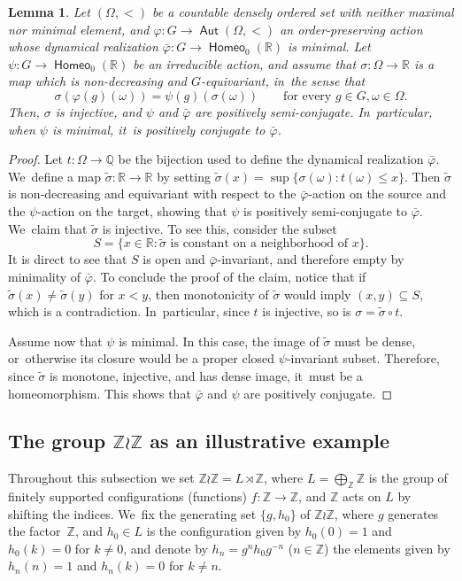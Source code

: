 \documentclass[10pt]{amsart}
\newtheorem{lem}[thm]{Lemma}
\theoremstyle{definition}
\DeclareMathOperator{\Aut}{\mathsf{Aut}}
\DeclareMathOperator{\homeo}{\mathsf{Homeo}}
\newcommand{\R}{\mathbb{R}}
\newcommand{\Q}{\mathbb Q}
\newcommand{\Z}{\mathbb Z}
\begin{document}
\begin{lem} \label{l-dynamical-realisation}
Let $(\Omega,<)$ be a countable densely ordered set with neither maximal nor minimal element, and $\varphi\colon G\to \Aut(\Omega,<)$ an order-preserving action whose dynamical realization $\bar\varphi\colon G\to \homeo_0(\R)$ is minimal.
Let $\psi\colon G\to \homeo_0(\R)$ be an irreducible action, and assume that $\sigma\colon \Omega\to \R$ is a map which is non-decreasing and $G$-equivariant, in~the sense that
\[ \sigma (\varphi(g)(\omega))=\psi(g)(\sigma(\omega)) \quad \quad \text{for every }g\in G, \omega\in \Omega.
\]
Then, $\sigma$ is injective, and $\psi$ and $\bar{\varphi}$ are positively semi-conjugate. In~particular, when $\psi$ is minimal, it~is positively conjugate to $\bar{\varphi}$.
\end{lem}

\begin{proof}
Let $t\colon \Omega\to \Q$ be the bijection used to define the dynamical realization $\bar\varphi$. We~define a map $\tilde{\sigma}\colon \R \to \R$ by setting $\tilde{\sigma}(x)=\sup \{\sigma(\omega) : t(\omega) \le x\}$. Then $\tilde{\sigma}$ is non-decreasing and equivariant with respect to the $\bar{\varphi}$-action on the source and the $\psi$-action on the target, showing that $\psi$ is positively semi-conjugate to $\bar{\varphi}$. We~claim that $\tilde{\sigma}$ is injective. To see this, consider the subset
\[S=\{x\in\R:\tilde\sigma\text{ is constant on a neighborhood of }x\}.
\]
It is direct to see that $S$ is open and $\bar\varphi$-invariant, and therefore empty by minimality of $\bar{\varphi}$. To conclude the proof of the claim, notice that if $\tilde{\sigma}(x)\neq\tilde\sigma(y)$ for $x<y$, then monotonicity of $\tilde\sigma$ would imply $(x,y)\subseteq S$, which is a contradiction. In~particular, since $t$ is injective, so is $\sigma=\tilde{\sigma}\circ t$.

Assume now that $\psi$ is minimal. In this case, the image of $\tilde\sigma$ must be dense, or~otherwise its closure would be a proper closed $\psi$-invariant subset. Therefore, since $\tilde{\sigma}$ is monotone, injective, and has dense image, it~must be a homeomorphism. This shows that $\bar{\varphi}$ and $\psi$ are positively conjugate.
\end{proof}
\setcounter{subsection}{2}
\subsection{The group $\Z\wr\Z$ as an illustrative example} \label{sec ejemplo lamp lighter}
Throughout this subsection we set $\Z \wr \Z=L\rtimes \Z$, where $L=\bigoplus_\Z \Z$ is the group of finitely supported configurations (functions) $f\colon \Z\to \Z$, and $\Z$ acts on $L$ by shifting the indices. We~fix the generating set $\{g,h_0\}$ of $\Z\wr\Z$, where $g$ generates the factor~$\Z$, and $h_0\in L$ is the configuration given by $h_0(0)=1$ and $h_0(k)=0$ for $k\neq 0$, and denote by $h_n=g^nh_0g^{-n}$ ($n\in \Z$) the elements given by $h_n(n)=1$ and $h_n(k)=0$ for $k\neq n$.
\end{document}
